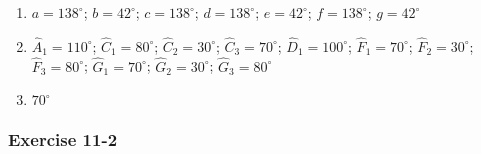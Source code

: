 {\begin{multicols}{3}
\begin{enumerate}[label=\textbf{\arabic*}.]
\item %
    $a=138^{\circ}$; $b=42^{\circ}$; $c=138^{\circ}$; $d=138^{\circ}$; $e=42^{\circ}$; $f=138^{\circ}$; $g=42^{\circ}$
\item %
 $\hat{A}_1=110^{\circ}$; $\hat{C}_1=80^{\circ}$; $\hat{C}_2=30^{\circ}$; $\hat{C}_3=70^{\circ}$; $\hat{D}_1=100^{\circ}$; $\hat{F}_1=70^{\circ}$; $\hat{F}_2=30^{\circ}$; $\hat{F}_3=80^{\circ}$; $\hat{G}_1=70^{\circ}$; $\hat{G}_2=30^{\circ}$; $\hat{G}_3=80^{\circ}$
\item $70^{\circ}$%
% 
\end{enumerate}

\subsubsection*{Exercise 11-2} %


\end{multicols}}
